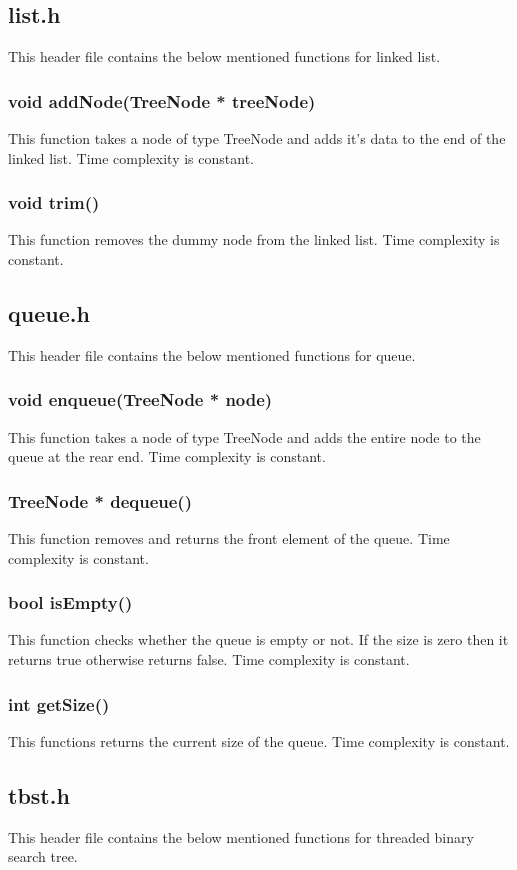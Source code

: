 \documentclass{article}
\begin{document}
\subsection{list.h}
This header file contains the below mentioned functions for linked list.
\subsubsection{void addNode(TreeNode * treeNode)}
This function takes a node of type TreeNode and adds it's data to the end of the linked list. Time complexity is constant.
\subsubsection{void trim()}
This function removes the dummy node from the linked list. Time complexity is constant.

\subsection{queue.h}
This header file contains the below mentioned functions for queue.
\subsubsection{void enqueue(TreeNode * node)}
This function takes a node of type TreeNode and adds the entire node to the queue at the rear end. Time complexity is constant.
\subsubsection{TreeNode * dequeue()}
This function removes and returns the front element of the queue. Time complexity is constant.
\subsubsection{bool isEmpty()}
This function checks whether the queue is empty or not. If the size is zero then it returns true otherwise returns false. Time complexity is constant.
\subsubsection{int getSize()}
This functions returns the current size of the queue. Time complexity is constant.

\subsection{tbst.h}
This header file contains the below mentioned functions for threaded binary search tree.
\end{document}
